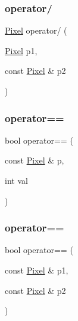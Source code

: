 \mbox{\label{class_pixel_af34817f1230d64fb0bdfbe4641800a7c}} 
\subsubsection{\texorpdfstring{operator/}{operator/}}
{\footnotesize\ttfamily \mbox{\hyperlink{class_pixel}{Pixel}} operator/ (\begin{DoxyParamCaption}\item[{\mbox{\hyperlink{class_pixel}{Pixel}}}]{p1,  }\item[{const \mbox{\hyperlink{class_pixel}{Pixel}} \&}]{p2 }\end{DoxyParamCaption})\hspace{0.3cm}{\ttfamily [friend]}}

\mbox{\label{class_pixel_a055a296d7cc5f82c9f87fe1ec434a5f7}} 
\subsubsection{\texorpdfstring{operator==}{operator==}\hspace{0.1cm}{\footnotesize\ttfamily [1/2]}}
{\footnotesize\ttfamily bool operator== (\begin{DoxyParamCaption}\item[{const \mbox{\hyperlink{class_pixel}{Pixel}} \&}]{p,  }\item[{int}]{val }\end{DoxyParamCaption})\hspace{0.3cm}{\ttfamily [friend]}}

\mbox{\label{class_pixel_ad9fdc4ca4a54c2cc05f02523eb3a6a9b}} 
\subsubsection{\texorpdfstring{operator==}{operator==}\hspace{0.1cm}{\footnotesize\ttfamily [2/2]}}
{\footnotesize\ttfamily bool operator== (\begin{DoxyParamCaption}\item[{const \mbox{\hyperlink{class_pixel}{Pixel}} \&}]{p1,  }\item[{const \mbox{\hyperlink{class_pixel}{Pixel}} \&}]{p2 }\end{DoxyParamCaption})\hspace{0.3cm}{\ttfamily [friend]}}

